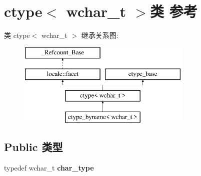 \hypertarget{classctype_3_01wchar__t_01_4}{}\section{ctype$<$ wchar\+\_\+t $>$类 参考}
\label{classctype_3_01wchar__t_01_4}
类 ctype$<$ wchar\+\_\+t $>$ 继承关系图\+:\begin{figure}[H]
\begin{center}
\leavevmode
\includegraphics[height=4.000000cm]{classctype_3_01wchar__t_01_4}
\end{center}
\end{figure}
\subsection*{Public 类型}
\begin{DoxyCompactItemize}
\item 
\mbox{\label{classctype_3_01wchar__t_01_4_a53b8e0a8fe455d536b2fa6ab55457932}} 
typedef wchar\+\_\+t {\bfseries char\+\_\+type}
\end{DoxyCompactItemize}
